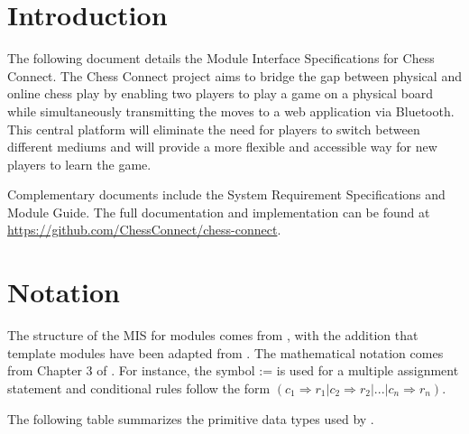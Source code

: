 \documentclass[12pt, titlepage]{article}
\begin{document}
\newpage

\tableofcontents

\newpage


\section{Introduction}

The following document details the Module Interface Specifications for
Chess Connect. The Chess Connect project aims to bridge the gap between physical and online chess play by enabling two players to play a game on a physical board while simultaneously transmitting the moves to a web application via Bluetooth. This central platform will eliminate the need for players to switch between different mediums and will provide a more flexible and accessible way for new players to learn the game.

Complementary documents include the System Requirement Specifications
and Module Guide.  The full documentation and implementation can be
found at \url{https://github.com/ChessConnect/chess-connect}.

\section{Notation}


The structure of the MIS for modules comes from \citet{HoffmanAndStrooper1995},
with the addition that template modules have been adapted from
\cite{GhezziEtAl2003}.  The mathematical notation comes from Chapter 3 of
\citet{HoffmanAndStrooper1995}.  For instance, the symbol := is used for a
multiple assignment statement and conditional rules follow the form $(c_1
\Rightarrow r_1 | c_2 \Rightarrow r_2 | ... | c_n \Rightarrow r_n )$.

The following table summarizes the primitive data types used by \progname. 
\end{document}
